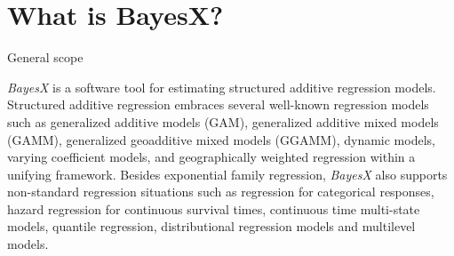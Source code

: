 \chapter{What is BayesX?}

\begin{stanza}{General scope}

{\it BayesX} is a software tool for estimating structured additive
regression models. Structured additive regression embraces
several well-known regression models such as generalized additive
models (GAM), generalized additive mixed models (GAMM),
generalized geoadditive mixed models (GGAMM), dynamic models,
varying coefficient models, and geographically weighted regression
within a unifying framework. Besides exponential family
regression, {\em BayesX} also supports non-standard regression
situations such as regression for categorical responses, hazard
regression for continuous survival times, continuous time
multi-state models, quantile regression, distributional regression models and multilevel models.
\end{stanza}

